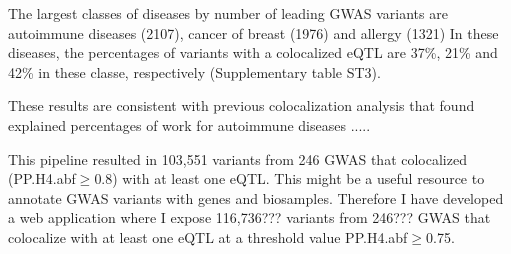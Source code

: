 The largest classes of diseases by number of leading GWAS variants are autoimmune diseases (2107), cancer of breast (1976) and allergy (1321)
%
In these diseases, the percentages of variants with a colocalized eQTL are 37\%, 21\% and 42\% in these classe, respectively (Supplementary table ST3).

These results are consistent with previous colocalization analysis that found explained percentages of work for autoimmune diseases \citep{2021.Li.Mu}.....

This pipeline resulted in 103,551 variants from 246 GWAS that colocalized (PP.H4.abf$\geq$0.8) with at least one eQTL.
%
This might be a useful resource to annotate GWAS variants with genes and biosamples.
Therefore I have developed a web application where I expose 116,736??? variants from 246??? GWAS that colocalize with at least one eQTL at a threshold value PP.H4.abf$\geq$0.75.

